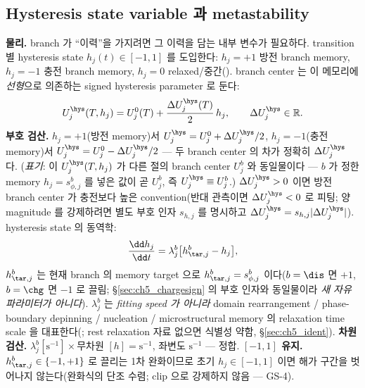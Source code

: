 \subsection{Hysteresis state variable 과 metastability}\label{sec:ch5_hstate}
\textbf{물리.} branch 가 ``이력''을 가지려면 그 이력을 담는 내부 변수가 필요하다. transition 별 hysteresis state
$h_j(t)\in[-1,1]$ 를 도입한다: $h_j=+1$ 방전 branch memory, $h_j=-1$ 충전 branch memory, $h_j=0$
relaxed/중간(). branch center 는 이 메모리에 \emph{선형}으로 의존하는 signed hysteresis parameter 로
둔다:
\begin{equation}
U_j^\hys(T,h_j)=U_j^0(T)+\frac{\Delta U_j^\hys(T)}{2}\,h_j,\qquad \Delta U_j^\hys\in\mathbb R.
\label{eq:ch5_hys_center}
\end{equation}
\textbf{부호 검산.} $h_j=+1$(방전 memory)서 $U_j^\hys=U_j^0+\Delta U_j^\hys/2$, $h_j=-1$(충전 memory)서
$U_j^\hys=U_j^0-\Delta U_j^\hys/2$ — 두 branch center 의 차가 정확히 $\Delta U_j^\hys$ 다. (\emph{표기}: 이
$U_j^\hys(T,h_j)$ 가 다른 절의 branch center $U_j^b$ 와 동일물이다 — $b$ 가 정한 memory $h_j=s_{\phi,j}^b$ 를
넣은 값이 곧 $U_j^b$, 즉 $U_j^\hys\equiv U_j^b$.)
$\Delta U_j^\hys>0$ 이면 방전 branch center 가 충전보다 높은 convention(반대 관측이면 $\Delta U_j^\hys<0$ 로
피팅; 양 magnitude 를 강제하려면 별도 부호 인자 $s_{h,j}$ 를 명시하고 $\Delta U_j^\hys=s_{h,j}|\Delta U_j^\hys|$).
hysteresis state 의 동역학:
\begin{equation}
\frac{\dd h_j}{\dd t}=\lambda_j^b\big[h_{\tar,j}^b-h_j\big],
\label{eq:ch5_h_dyn}
\end{equation}
$h_{\tar,j}^b$ 는 현재 branch 의 memory target 으로 $h_{\tar,j}^b=s_{\phi,j}^b$ 이다($b=\dis$ 면 $+1$, $b=\chg$ 면
$-1$ 로 끌림; \S\ref{sec:ch5_chargesign} 의 부호 인자와 동일물이라 \emph{새 자유 파라미터가 아니다}). $\lambda_j^b$
는 \emph{fitting speed 가 아니라} domain rearrangement / phase-boundary depinning / nucleation /
microstructural memory 의 relaxation time scale 을 대표한다(; rest relaxation 자료 없으면 식별성 약함,
\S\ref{sec:ch5_ident}). \textbf{차원 검산.} $\lambda_j^b[\mathrm{s^{-1}}]\times$무차원 $[h]=\mathrm{s^{-1}}$,
좌변도 $\mathrm{s^{-1}}$ — 정합. \textbf{$[-1,1]$ 유지.} $h_{\tar,j}^b\in\{-1,+1\}$ 로 끌리는 1차 완화이므로
초기 $h_j\in[-1,1]$ 이면 해가 구간을 벗어나지 않는다(완화식의 단조 수렴; clip 으로 강제하지 않음 — GS-4).

